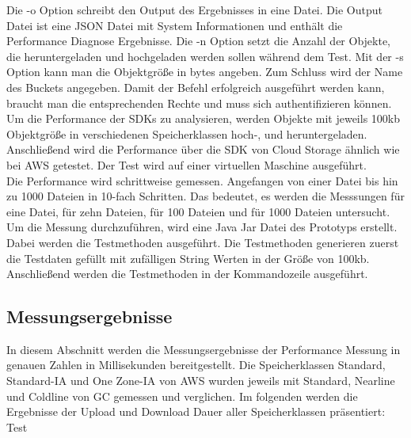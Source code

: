 Die -o Option schreibt den Output des Ergebnisses in eine Datei. Die Output Datei ist eine JSON Datei mit System Informationen und enthält die Performance Diagnose Ergebnisse. Die -n Option setzt die Anzahl der Objekte, die heruntergeladen und hochgeladen werden sollen während dem Test. Mit der -s Option kann man die Objektgröße in bytes angeben. Zum Schluss wird der Name des Buckets angegeben. Damit der Befehl erfolgreich ausgeführt werden kann, braucht man die entsprechenden Rechte und muss sich authentifizieren können.\\

Um die Performance der SDKs zu analysieren, werden Objekte mit jeweils 100kb Objektgröße in verschiedenen Speicherklassen hoch-, und heruntergeladen. Anschließend wird die Performance über die SDK von Cloud Storage ähnlich wie bei AWS getestet. Der Test wird auf einer virtuellen Maschine ausgeführt.\\

Die Performance wird schrittweise gemessen. Angefangen von einer Datei bis hin zu 1000 Dateien in 10-fach Schritten. Das bedeutet, es werden die Messsungen für eine Datei, für zehn Dateien, für 100 Dateien und für 1000 Dateien untersucht. Um die Messung durchzuführen, wird eine Java Jar Datei des Prototyps erstellt. Dabei werden die Testmethoden ausgeführt. Die Testmethoden generieren zuerst die Testdaten gefüllt mit zufälligen String Werten in der Größe von 100kb. Anschließend werden die Testmethoden in der Kommandozeile ausgeführt.

\newpage

\subsection{Messungsergebnisse}

In diesem Abschnitt werden die Messungsergebnisse der Performance Messung in genauen Zahlen in Millisekunden bereitgestellt. Die Speicherklassen Standard, Standard-IA und One Zone-IA von AWS wurden jeweils mit Standard, Nearline und Coldline von GC gemessen und verglichen. Im folgenden werden die Ergebnisse der Upload und Download Dauer aller Speicherklassen präsentiert: Test

